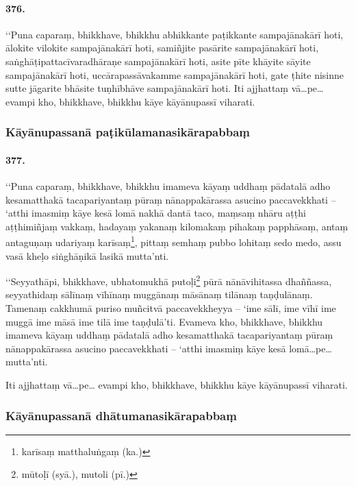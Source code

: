 \paragraph{376.} ‘‘Puna caparaṃ, bhikkhave, bhikkhu abhikkante paṭikkante sampajānakārī hoti, ālokite vilokite sampajānakārī hoti, samiñjite pasārite sampajānakārī hoti, saṅghāṭipattacīvaradhāraṇe sampajānakārī hoti, asite pīte khāyite sāyite sampajānakārī hoti, uccārapassāvakamme sampajānakārī hoti, gate ṭhite nisinne sutte jāgarite bhāsite tuṇhībhāve sampajānakārī hoti. Iti ajjhattaṃ vā…pe… evampi kho, bhikkhave, bhikkhu kāye kāyānupassī viharati.


\subsubsection{Kāyānupassanā paṭikūlamanasikārapabbaṃ}

\paragraph{377.} ‘‘Puna caparaṃ, bhikkhave, bhikkhu imameva kāyaṃ uddhaṃ pādatalā adho kesamatthakā tacapariyantaṃ pūraṃ nānappakārassa asucino paccavekkhati – ‘atthi imasmiṃ kāye kesā lomā nakhā dantā taco, maṃsaṃ nhāru aṭṭhi aṭṭhimiñjaṃ vakkaṃ, hadayaṃ yakanaṃ kilomakaṃ pihakaṃ papphāsaṃ, antaṃ antaguṇaṃ udariyaṃ karīsaṃ\footnote{karīsaṃ matthaluṅgaṃ (ka.)}, pittaṃ semhaṃ pubbo lohitaṃ sedo medo, assu vasā kheḷo siṅghāṇikā lasikā mutta’nti.

‘‘Seyyathāpi, bhikkhave, ubhatomukhā putoḷi\footnote{mūtoḷī (syā.), mutoli (pī.)} pūrā nānāvihitassa dhaññassa, seyyathidaṃ sālīnaṃ vīhīnaṃ muggānaṃ māsānaṃ tilānaṃ taṇḍulānaṃ. Tamenaṃ cakkhumā puriso muñcitvā paccavekkheyya – ‘ime sālī, ime vīhī ime muggā ime māsā ime tilā ime taṇḍulā’ti. Evameva kho, bhikkhave, bhikkhu imameva kāyaṃ uddhaṃ pādatalā adho kesamatthakā tacapariyantaṃ pūraṃ nānappakārassa asucino paccavekkhati – ‘atthi imasmiṃ kāye kesā lomā…pe… mutta’nti.

Iti ajjhattaṃ vā…pe… evampi kho, bhikkhave, bhikkhu kāye kāyānupassī viharati.


\subsubsection{Kāyānupassanā dhātumanasikārapabbaṃ}

